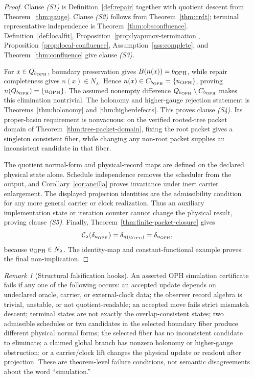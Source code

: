 \documentclass[11pt]{article}
\theoremstyle{remark}
\newtheorem{remark}[theorem]{Remark}
\theoremstyle{plain}
\begin{document}
\begin{proof}
Clause \emph{(S1)} is Definition~\ref{def:repair} together with quotient descent from
Theorem~\ref{thm:gauge}. Clause \emph{(S2)} follows from Theorem~\ref{thm:crdt}; terminal
representative independence is Theorem~\ref{thm:obsconfluence}. Definition~\ref{def:localfit},
Proposition~\ref{prop:lyapunov-termination}, Proposition~\ref{prop:local-confluence},
Assumption~\ref{ass:complete}, and Theorem~\ref{thm:confluence} give clause \emph{(S3)}.

For \(x\in Q_{b_{\rm OPH}}\), boundary preservation gives
\(B(n(x))=b_{\rm OPH}\), while repair completeness gives \(n(x)\in N_\lambda\). Hence
\(n(x)\in C_{b_{\rm OPH}}=\{u_{\rm OPH}\}\), proving
\(n(Q_{b_{\rm OPH}})=\{u_{\rm OPH}\}\). The assumed nonempty difference
\(Q_{b_{\rm OPH}}\setminus C_{b_{\rm OPH}}\) makes this elimination nontrivial. The
holonomy and higher-gauge rejection statement is Theorems~\ref{thm:holonomy} and
\ref{thm:higherdefects}. This proves clause \emph{(S4)}. Its proper-basin requirement is
nonvacuous: on the verified rooted-tree packet domain of Theorem~\ref{thm:tree-packet-domain},
fixing the root packet gives a singleton consistent fiber, while changing any non-root packet
supplies an inconsistent candidate in that fiber.

The quotient normal-form and physical-record maps are defined on the declared physical state
alone. Schedule independence removes the scheduler from the output, and
Corollary~\ref{cor:ancilla} proves invariance under inert carrier enlargement. The displayed
projection identities are the admissibility condition for any more general carrier or clock
realization. Thus an auxiliary implementation state or iteration counter cannot change the
physical result, proving clause \emph{(S5)}. Finally,
Theorem~\ref{thm:finite-packet-closure} gives
\[
 \mathcal C_\lambda(\delta_{u_{\rm OPH}})
 =\delta_{n(u_{\rm OPH})}
 =\delta_{u_{\rm OPH}},
\]
because \(u_{\rm OPH}\in N_\lambda\). The identity-map and constant-functional example
proves the final non-implication.
\end{proof}

\begin{remark}[Structural falsification hooks]\label{rem:oph-simulation-falsifiers}
An asserted OPH simulation certificate fails if any one of the following occurs: an accepted
update depends on undeclared oracle, carrier, or external-clock data; the observer record
algebra is trivial, unstable, or not quotient-readable; an accepted move fails strict mismatch
descent; terminal states are not exactly the overlap-consistent states; two admissible schedules
or two candidates in the selected boundary fiber produce different physical normal forms; the
selected fiber has no inconsistent candidate to eliminate; a claimed global branch has nonzero
holonomy or higher-gauge obstruction; or a carrier/clock lift changes the physical update or
readout after projection. These are theorem-level failure conditions, not semantic disagreements
about the word ``simulation.''
\end{remark}
\end{document}
